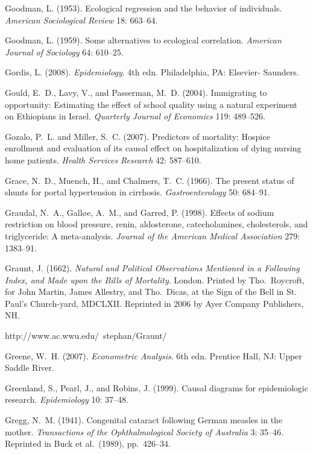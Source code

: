 \smallskip\noindent
Goodman, L. (1953).
Ecological regression and the behavior of individuals.
{\it American Sociological Review\/} 18: 663--64.

\smallskip\noindent
Goodman, L. (1959).
Some alternatives to ecological correlation.
{\it American Journal of Sociology\/} 64: 610--25.

\smallskip\noindent
Gordis, L. (2008).
{\it Epidemiology\/}. 4th edn.
Philadelphia, PA: Elsevier-
Saunders.

\smallskip\noindent
Gould, E.~D., Lavy, V., and Passerman, M.~D. (2004).
Immigrating to opportunity:
Estimating the effect of school quality using a natural experiment on Ethiopians in Israel.
{\it Quarterly Journal of Economics\/} 119: 489--526.

\smallskip\noindent
Gozalo, P.~L. and Miller, S.~C. (2007).
Predictors of mortality:
Hospice enrollment and evaluation of its causal effect on
hospitalization of dying nursing home patients.
{\it Health Services Research\/} 42: 587--610.

\smallskip\noindent
Grace, N.~D., Muench, H., and Chalmers, T.~C. (1966).
The present status of shunts for portal hypertension in cirrhosis.
{\it Gastroenterology\/} 50: 684--91.

\smallskip\noindent
Graudal, N.~A., Gall\o e, A.~M., and Garred, P. (1998).
Effects of sodium restriction on blood pressure, renin, aldosterone,
catecholamines, cholesterols, and triglyceride: A meta-analysis.
{\it Journal of the American Medical Association\/} 279: 1383--91.

\smallskip\noindent
Graunt, J. (1662).
{\it Natural and Political Observations Mentioned in a Following Index,
and Made upon the Bills of Mortality\/}.
London. Printed by Tho.~Roycroft, for John Martin, James Allestry, and Tho.~Dicas,
at the Sign of the Bell in St. Paul's Church-yard, MDCLXII.
Reprinted in 2006 by
Ayer Company Publishers, NH.

\noindent\hskip 10pt
http://www.ac.wwu.edu/\string~stephan/Graunt/

\smallskip\noindent
Greene, W.~H. (2007).
{\it Econometric Analysis\/}. 6th edn.
Prentice Hall, NJ: Upper Saddle River.

\smallskip\noindent
Greenland, S., Pearl, J., and Robins, J. (1999).
Causal diagrams for epidemiologic research.
{\it Epidemiology} 10: 37--48.

\smallskip\noindent
Gregg, N.~M. (1941).
Congenital cataract following German measles in the mother.
{\it Transactions of the Ophthalmological Society of Australia\/} 3: 35--46.
Reprinted in Buck et al.~(1989), pp.~426--34.

